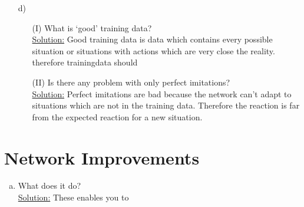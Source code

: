 \documentclass[DIN, pagenumber=false, fontsize=11pt, parskip=half]{scrartcl}
\newcommand{\sol}{\underline{Solution:} }
\begin{document}
\begin{enumerate}[b)]
	changing the hyper-parameters? Can you explain this?\\\sol
	Yes, it can be archived. As you change the Hyperparameter, you change the behaviour or the calculation of the network. Therefore it is possible, that you can optimize by changing them.\\
	Low learningrate with few epochs results in a bad learning.
	\item[d)] \begin{enumerate}
		\item[(I)] What is ‘good’ training data? \\\sol
		Good training data is data which contains every possible situation or situations with actions which are very close the reality. therefore trainingdata should 
		\item[(II)] Is there any problem with only perfect imitations?\\\sol
		Perfect imitations are bad because the network can't adapt to situations which are not in the training data. Therefore the reaction is far from the expected reaction for a new situation.
	\end{enumerate}
\end{enumerate}
\section{Network Improvements}
\begin{enumerate}[a)]
	\item What does it do?\\\sol These enables you to
\end{enumerate}
\end{document}
